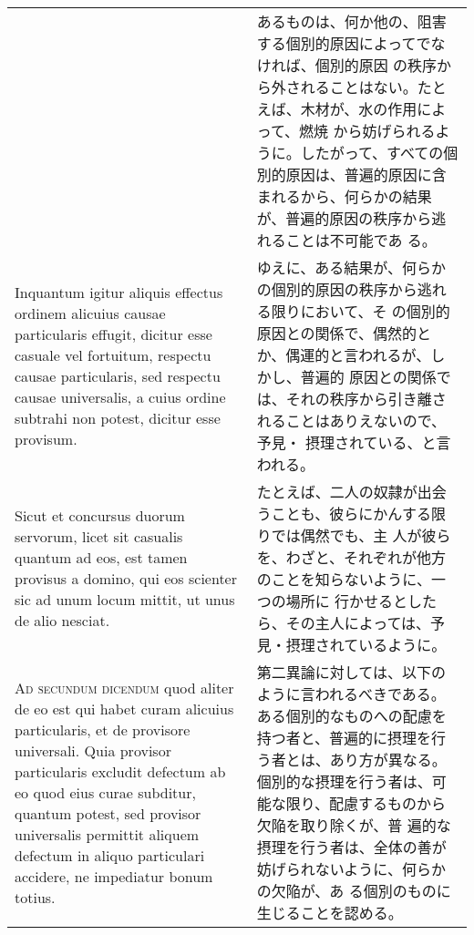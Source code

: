 \documentclass[10pt]{jsarticle} %
\begin{document}
\begin{longtable}{p{21em}p{21em}}
&

あるものは、何か他の、阻害する個別的原因によってでなければ、個別的原因
の秩序から外されることはない。たとえば、木材が、水の作用によって、燃焼
から妨げられるように。したがって、すべての個別的原因は、普遍的原因に含
まれるから、何らかの結果が、普遍的原因の秩序から逃れることは不可能であ
る。


\\


Inquantum igitur aliquis
effectus ordinem alicuius causae particularis effugit, dicitur esse
casuale vel fortuitum, respectu causae particularis, sed respectu causae
universalis, a cuius ordine subtrahi non potest, dicitur esse
provisum. 


&

ゆえに、ある結果が、何らかの個別的原因の秩序から逃れる限りにおいて、そ
の個別的原因との関係で、偶然的とか、偶運的と言われるが、しかし、普遍的
原因との関係では、それの秩序から引き離されることはありえないので、予見・
摂理されている、と言われる。


\\


Sicut et concursus duorum servorum, licet sit casualis quantum
ad eos, est tamen provisus a domino, qui eos scienter sic ad unum locum
mittit, ut unus de alio nesciat.



&

たとえば、二人の奴隷が出会うことも、彼らにかんする限りでは偶然でも、主
人が彼らを、わざと、それぞれが他方のことを知らないように、一つの場所に
行かせるとしたら、その主人によっては、予見・摂理されているように。


\\




{\scshape Ad secundum dicendum} quod aliter de eo est
qui habet curam alicuius particularis, et de provisore universali. Quia
provisor particularis excludit defectum ab eo quod eius curae subditur,
quantum potest, sed provisor universalis permittit aliquem defectum in
aliquo particulari accidere, ne impediatur bonum totius. 

&

第二異論に対しては、以下のように言われるべきである。
ある個別的なものへの配慮を持つ者と、普遍的に摂理を行う者とは、あり方が異なる。
個別的な摂理を行う者は、可能な限り、配慮するものから欠陥を取り除くが、普
 遍的な摂理を行う者は、全体の善が妨げられないように、何らかの欠陥が、あ
 る個別のものに生じることを認める。




\end{longtable}
\end{document}
